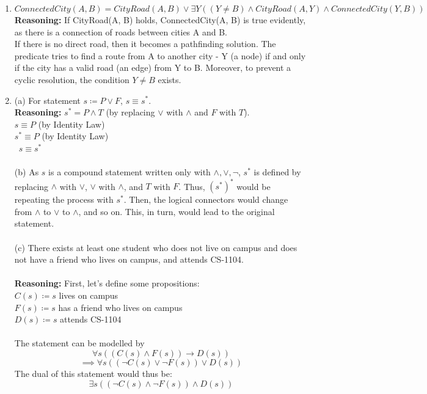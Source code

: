 \documentclass[a4paper]{article}
\begin{document}
    \begin{enumerate}
        \item 
$$
ConnectedCity(A, B) = CityRoad(A, B) \lor \exists Y ((Y \neq B) \land CityRoad(A, Y) \land ConnectedCity(Y, B))
$$
\textbf{Reasoning:} If CityRoad(A, B) holds, ConnectedCity(A, B) is true evidently, as there is a connection of roads between cities A and B. \\
If there is no direct road, then it becomes a pathfinding solution. The predicate tries to find a route from A to another city - Y (a node) if and only if the city has a valid road (an edge) from Y to B. Moreover, to prevent a cyclic resolution, the condition $Y \neq B$ exists. 

\item (a) For statement $s \coloneqq P \lor F$, $s \equiv s^*$.\\
\textbf{Reasoning:} $s^* = P \land T$ (by replacing $\lor$ with $\land$ and $F$ with $T$).\\
$s \equiv P$ (by Identity Law)\\
$s^* \equiv P$ (by Identity Law)\\
\therefore\ $s \equiv s^*$\\
\\
(b) As $s$ is a compound statement written only with $\land, \lor, \neg$, $s^*$ is defined by replacing $\land$ with $\lor$, $\lor$ with $\land$, and $T$ with $F$. Thus, $(s^*)^*$ would be repeating the process with $s^*$. Then, the logical connectors would change from $\land$ to $\lor$ to $\land$, and so on. This, in turn, would lead to the original statement.\\
    
\\
(c) There exists at least one student who does not live on campus and does not have a friend who lives on campus, and attends CS-1104.\\
\\ 
\textbf{Reasoning:} First, let's define some propositions:\\
$C(s) \coloneqq s$ lives on campus\\
$F(s) \coloneqq s$ has a friend who lives on campus\\
$D(s) \coloneqq s$ attends CS-1104\\
\\
The statement can be modelled by
$$
\forall s\left((C(s) \land F(s)) \rightarrow D(s)\right)
$$
$$
\implies \forall s \left((\neg C(s) \lor \neg F(s)) \lor D(s)\right)
$$
The dual of this statement would thus be:
$$
\exists s \left((\neg C(s) \land \neg F(s)) \land D(s)\right)
$$ 
\blacksquare \\



\end{enumerate}
\end{document}

